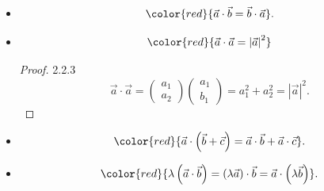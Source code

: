 \documentclass[12pt, a4paper]{article}
\begin{document}
\begin{enumerate}
\begin{itemize}
    \begin{proof}{2.2.2}{}
      Angel between $\vec{a}$ and $\vec{b}$ is $0^\circ$.\\
      $\cos0^\circ=1\ \Rightarrow\ \vec{a}\cdot\vec{b}=\left|\vec{a}\right|\left|\vec{b}\right|$ for $\vec{a},\ \vec{b}$ at the same direction.\\
      OR $\vec{a}\cdot\vec{b}=-\left|\vec{a}\right|\left|\vec{b}\right|$ for $\vec{a}$ and $\vec{b}$ at opposite directions. 
    \end{proof}
    \item $${\color{red}{\vec{a}\cdot\vec{b}=\vec{b}\cdot\vec{a}}}.$$
    \item $${\color{red}{\vec{a}\cdot\vec{a}=\left|\vec{a}\right|^2}}$$
    \begin{proof}{2.2.3}{}
      $$\vec{a}\cdot\vec{a}=\begin{pmatrix}a_1\\a_2\end{pmatrix}\begin{pmatrix}a_1\\b_1\end{pmatrix}=a_1^2+a_2^2=\left|\vec{a}\right|^2.$$
    \end{proof}
    \item $${\color{red}{\vec{a}\cdot\left(\vec{b}+\vec{c}\right)=\vec{a}\cdot\vec{b}+\vec{a}\cdot\vec{c}}}.$$
    \item $${\color{red}{\lambda\left(\vec{a}\cdot\vec{b}\right)=\left(\lambda\vec{a}\right)\cdot\vec{b}=\vec{a}\cdot\left(\lambda\vec{b}\right)}}.$$
  \end{itemize}
\end{enumerate}
\end{document}
